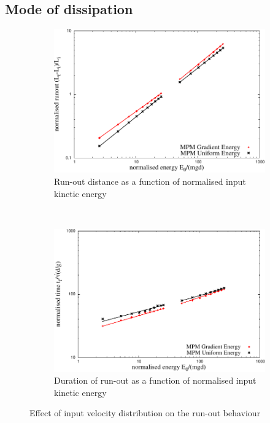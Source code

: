 \subsection*{Mode of dissipation}

\begin{figure}[tbph]
\centering
\begin{subfigure}[b]{0.95\textwidth}
\centering
\includegraphics[width=\textwidth]{Runout_Eo_GU}
\caption{Run-out distance as a function of normalised input kinetic energy}
\label{fig:Runout_Eo_GU}
\end{subfigure}
\\
\begin{subfigure}[b]{0.95\textwidth}
\centering
\includegraphics[width=\textwidth]{time_Eo_GU}
\caption{Duration of run-out as a function of normalised input kinetic energy}
\label{fig:time_Eo_GU}
\end{subfigure}
\caption{Effect of input velocity distribution on the run-out behaviour}
\label{fig:GU}
\end{figure}

